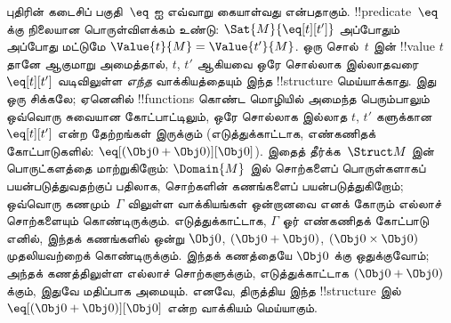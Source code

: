 \documentclass[../../../include/open-logic-section]{subfiles}
\begin{document}
{%
புதிரின் கடைசிப் பகுதி~$\eq$ ஐ எவ்வாறு கையாள்வது என்பதாகும்.
!!{predicate}~$\eq$ க்கு நிலையான பொருள்விளக்கம் உண்டு:
$\Sat{M}{\eq[t][t']}$ அப்போதும் அப்போது மட்டுமே
$\Value{t}{M} = \Value{t'}{M}$. ஒரு சொல்~$t$ இன் !!{value} $t$ தானே ஆகுமாறு
அமைத்தால், $t$, $t'$ ஆகியவை ஒரே சொல்லாக இல்லாதவரை $\eq[t][t']$ வடிவிலுள்ள
\emph{எந்த} வாக்கியத்தையும் இந்த !!{structure} மெய்யாக்காது. இது ஒரு சிக்கலே;
ஏனெனில் !!{function}s கொண்ட மொழியில் அமைந்த பெரும்பாலும் ஒவ்வொரு சுவையான
கோட்பாட்டிலும், ஒரே சொல்லாக இல்லாத $t$, $t'$ களுக்கான $\eq[t][t']$ என்ற
தேற்றங்கள் இருக்கும் (எடுத்துக்காட்டாக, எண்கணிதக் கோட்பாடுகளில்:
$\eq[(\Obj 0+ \Obj 0)][\Obj 0]$). இதைத் தீர்க்க~$\Struct M$ இன் பொருட்களத்தை
மாற்றுகிறோம்: $\Domain{M}$ இல் சொற்களைப் பொருள்களாகப் பயன்படுத்துவதற்குப்
பதிலாக, சொற்களின் கணங்களைப் பயன்படுத்துகிறோம்; ஒவ்வொரு கணமும்~$\Gamma$
விலுள்ள வாக்கியங்கள் ஒன்றானவை எனக் கோரும் எல்லாச் சொற்களையும் கொண்டிருக்கும்.
எடுத்துக்காட்டாக, $\Gamma$ ஓர் எண்கணிதக் கோட்பாடு எனில், இந்தக் கணங்களில்
ஒன்று $\Obj 0$, $(\Obj 0 + \Obj 0)$, $(\Obj 0 \times \Obj 0)$ முதலியவற்றைக்
கொண்டிருக்கும். இந்தக் கணத்தையே $\Obj 0$ க்கு ஒதுக்குவோம்; அந்தக் கணத்திலுள்ள
எல்லாச் சொற்களுக்கும், எடுத்துக்காட்டாக $(\Obj 0 + \Obj 0)$ க்கும், இதுவே
மதிப்பாக அமையும். எனவே, திருத்திய இந்த !!{structure} இல்
$\eq[(\Obj 0+ \Obj 0)][\Obj 0]$ என்ற வாக்கியம் மெய்யாகும்.}{}
\end{document}
